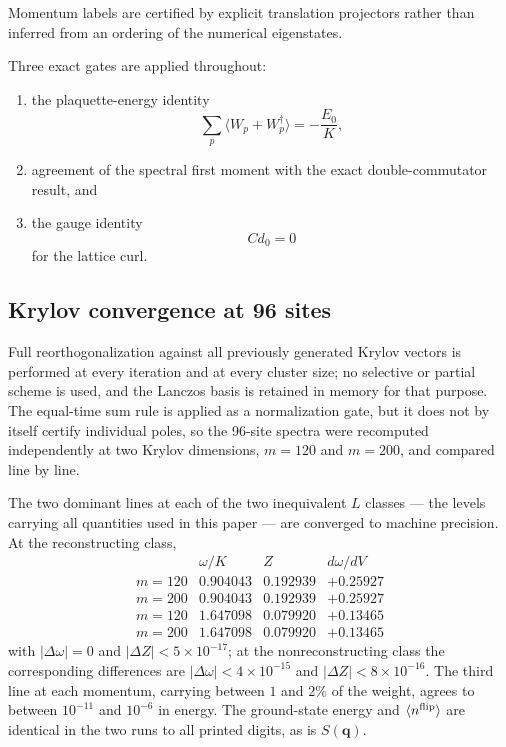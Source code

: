 \documentclass[
aps,
prl,
onecolumn,
amsmath,
amssymb,
superscriptaddress,
longbibliography
]{revtex4-2}
\newcommand{\bq}{\bm q}
\begin{document}
Momentum labels are certified by explicit translation projectors
rather than inferred from an ordering of the numerical eigenstates.

Three exact gates are applied throughout:
\begin{enumerate}
\item the plaquette-energy identity
\begin{equation}
\sum_p
\langle
W_p+W_p^\dagger
\rangle
=
-\frac{E_0}{K},
\end{equation}
\item agreement of the spectral first moment with the exact
double-commutator result, and
\item the gauge identity
\begin{equation}
Cd_0=0
\end{equation}
for the lattice curl.
\end{enumerate}

\subsection{Krylov convergence at 96 sites}
\label{sec:krylov}

Full reorthogonalization against all previously generated Krylov
vectors is performed at every iteration and at every cluster size; no
selective or partial scheme is used, and the Lanczos basis is retained
in memory for that purpose. The equal-time sum rule is applied as a
normalization gate, but it does not by itself certify individual
poles, so the 96-site spectra were recomputed independently at two
Krylov dimensions, $m=120$ and $m=200$, and compared line by line.

The two dominant lines at each of the two inequivalent $L$ classes ---
the levels carrying all quantities used in this paper --- are
converged to machine precision. At the reconstructing class,
\begin{equation}
\begin{array}{lccc}
 & \omega/K & Z & d\omega/dV\\[2pt]
m=120 & 0.904043 & 0.192939 & +0.25927\\
m=200 & 0.904043 & 0.192939 & +0.25927\\[4pt]
m=120 & 1.647098 & 0.079920 & +0.13465\\
m=200 & 1.647098 & 0.079920 & +0.13465
\end{array}
\end{equation}
with $|\Delta\omega|=0$ and $|\Delta Z|<5\times10^{-17}$; at the
nonreconstructing class the corresponding differences are
$|\Delta\omega|<4\times10^{-15}$ and $|\Delta Z|<8\times10^{-16}$.
The third line at each momentum, carrying between $1$ and $2\%$ of
the weight, agrees to between $10^{-11}$ and $10^{-6}$ in energy.
The ground-state energy and $\langle n^{\rm flip}\rangle$ are
identical in the two runs to all printed digits, as is $S(\bq)$.
\end{document}
